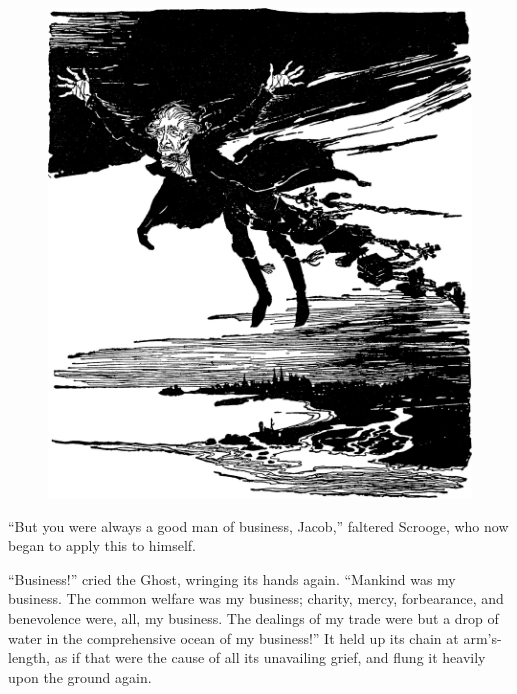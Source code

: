 \documentclass[paper=5.5in:8.5in,BCOR=7mm,twoside,DIV=calc,12pt,usegeometry]{scrbook} %
\begin{document}

\begin{figure}[t!]
\centering
\vfill
    \includegraphics[width=\columnwidth]{wingsofwind1}
    \vfill
\end{figure}

\enquote{But you were always a good man of business, Jacob,} faltered Scrooge, who now began to apply this to himself.

\enquote{Business!} cried the Ghost, wringing its hands again. \enquote{Mankind was my business. The common welfare was my business; charity, mercy, forbearance, and benevolence were, all, my business. The dealings of my trade were but a drop of water in the comprehensive ocean of my business!}
It held up its chain at arm's-length, as if that were the cause of all its unavailing grief, and flung it heavily upon the ground again.
\end{document}

